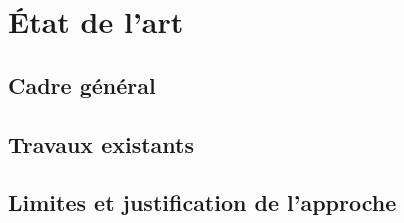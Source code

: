 \chapter{État de l'art}

\section{Cadre général}

\section{Travaux existants}

\section{Limites et justification de l'approche}

